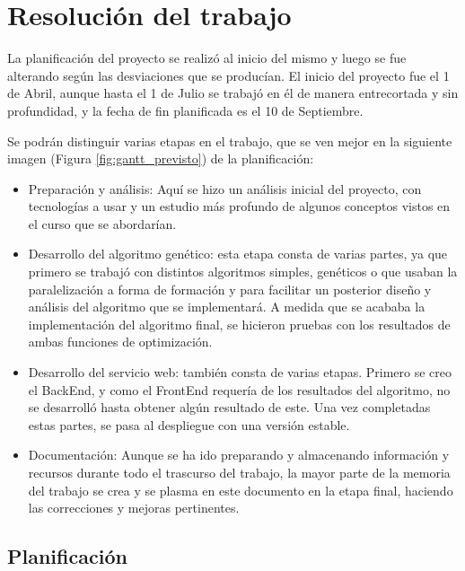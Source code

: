 \chapter{Resolución del trabajo}

\bigskip
La planificación del proyecto se realizó al inicio del mismo y luego se fue alterando según las desviaciones que se producían. El inicio del proyecto fue el 1 de Abril, aunque hasta el 1 de Julio se trabajó en él de manera entrecortada y sin profundidad, y la fecha de fin planificada es el 10 de Septiembre. 

Se podrán distinguir varias etapas en el trabajo, que se ven mejor en la siguiente imagen (Figura \ref{fig:gantt_previsto}) de la planificación:

\begin{itemize}
	\item Preparación y análisis: Aquí se hizo un análisis inicial del proyecto, con tecnologías a usar y un estudio más profundo de algunos conceptos vistos en el curso que se abordarían.
	
	\item Desarrollo del algoritmo genético: esta etapa consta de varias partes, ya que primero se trabajó con distintos algoritmos simples, genéticos o que usaban la paralelización a forma de formación y para facilitar un posterior diseño y análisis del algoritmo que se implementará. A medida que se acababa la implementación del algoritmo final, se hicieron pruebas con los resultados de ambas funciones de optimización.
	
	\item Desarrollo del servicio web: también consta de varias etapas. Primero se creo el BackEnd, y como el FrontEnd requería de los resultados del algoritmo, no se desarrolló hasta obtener algún resultado de este. Una vez completadas estas partes, se pasa al despliegue con una versión estable.
	
	\item Documentación: Aunque se ha ido preparando y almacenando información y recursos durante todo el trascurso del trabajo, la mayor parte de la memoria del trabajo se crea y se plasma en este documento en la etapa final, haciendo las correcciones y mejoras pertinentes.
\end{itemize}
 




\newpage
\section{Planificación}

